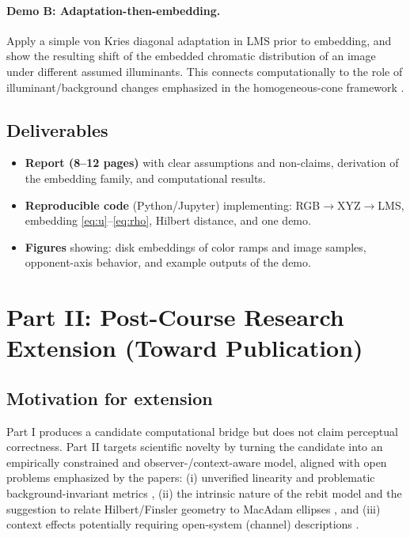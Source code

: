 \documentclass[11pt]{article}
\begin{document}
\paragraph{Demo B: Adaptation-then-embedding.}
Apply a simple von Kries diagonal adaptation in LMS prior to embedding, and show the resulting shift of the embedded chromatic distribution of an image under different assumed illuminants.
This connects computationally to the role of illuminant/background changes emphasized in the homogeneous-cone framework \cite{Provenzi2020}.

\subsection{Deliverables}
\begin{itemize}[leftmargin=2.2em]
\item \textbf{Report (8--12 pages)} with clear assumptions and non-claims, derivation of the embedding family, and computational results.
\item \textbf{Reproducible code} (Python/Jupyter) implementing: RGB$\to$XYZ$\to$LMS, embedding \eqref{eq:u}--\eqref{eq:rho}, Hilbert distance, and one demo.
\item \textbf{Figures} showing: disk embeddings of color ramps and image samples, opponent-axis behavior, and example outputs of the demo.
\end{itemize}

\section{Part II: Post-Course Research Extension (Toward Publication)}

\subsection{Motivation for extension}
Part I produces a candidate computational bridge but does not claim perceptual correctness.
Part II targets scientific novelty by turning the candidate into an empirically constrained and observer-/context-aware model, aligned with open problems emphasized by the papers:
(i) unverified linearity and problematic background-invariant metrics \cite{Provenzi2020},
(ii) the intrinsic nature of the rebit model and the suggestion to relate Hilbert/Finsler geometry to MacAdam ellipses \cite{Berthier2020},
and (iii) context effects potentially requiring open-system (channel) descriptions \cite{Berthier2020}.
\end{document}
